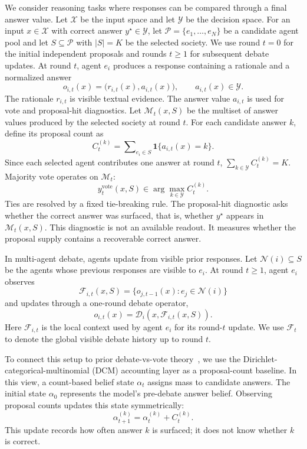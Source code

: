 \documentclass{article}
\begin{document}
We consider reasoning tasks where responses can be compared through a final
answer value. Let $\mathcal X$ be the input space and let $\mathcal Y$ be the
decision space. For an input $x\in\mathcal X$ with correct answer
$y^\star\in\mathcal Y$, let $\mathcal P=\{e_1,\ldots,e_N\}$ be a candidate
agent pool and let $S\subseteq\mathcal P$ with $|S|=K$ be the selected society.
We use round $t=0$ for the initial independent proposals and rounds $t\ge 1$ for
subsequent debate updates. At round $t$, agent $e_i$ produces a response
containing a rationale and a normalized answer
\[
    o_{i,t}(x)=\bigl(r_{i,t}(x),a_{i,t}(x)\bigr),
    \qquad a_{i,t}(x)\in\mathcal Y.
\]
The rationale $r_{i,t}$ is visible textual evidence. The answer value $a_{i,t}$
is used for vote and proposal-hit diagnostics.
Let $\mathcal M_t(x,S)$ be the multiset of answer values produced by the
selected society at round $t$. For each candidate answer $k$, define its
proposal count as
\[
    C_t^{(k)}=\sum\nolimits_{e_i\in S}\mathbf 1\{a_{i,t}(x)=k\}.
\]
Since each selected agent contributes one answer at round $t$,
$\sum_{k\in\mathcal Y}C_t^{(k)}=K$.
Majority vote operates on $\mathcal M_t$:
\[
    y_t^{\mathrm{vote}}(x,S)
    \in
    \arg\max_{k\in\mathcal Y} C_t^{(k)}.
\]
Ties are resolved by a fixed tie-breaking rule. The proposal-hit diagnostic asks
whether the correct answer was surfaced, that is, whether
$y^\star$ appears in $\mathcal M_t(x,S)$. This diagnostic is not an available readout. It
measures whether the proposal supply contains a recoverable correct answer.

In multi-agent debate, agents update from visible prior responses. Let
$\mathcal N(i)\subseteq S$ be the agents whose previous responses are visible to
$e_i$. At round $t\ge 1$,
agent $e_i$ observes
\[
    \mathcal F_{i,t}(x,S)=\{o_{j,t-1}(x):e_j\in\mathcal N(i)\}
\]
and updates through a one-round debate operator,
\[
    o_{i,t}(x)=\mathcal D_i(x,\mathcal F_{i,t}(x,S)).
\]
Here $\mathcal F_{i,t}$ is the local context used by agent $e_i$ for its
round-$t$ update. We use $\mathcal F_t$ to denote the global visible debate history
up to round $t$.

To connect this setup to prior debate-vs-vote theory~\citep{choi2026debate, smit2023are, zhang2025stopovervaluingmultiagentdebate, kaesberg-etal-2025-voting},
we use the Dirichlet-categorical-multinomial (DCM) accounting layer as a
proposal-count baseline. In this view, a count-based
belief state $\alpha_t$ assigns mass to candidate answers. The initial state
$\alpha_0$ represents the model's pre-debate answer belief. Observing proposal
counts updates this state symmetrically:
\begin{equation}
    \alpha_{t+1}^{(k)}=\alpha_t^{(k)}+C_t^{(k)}.
    \label{eq:dcm_count_update}
\end{equation}
This update records how often answer $k$ is surfaced; it does not know whether
$k$ is correct.
\end{document}
